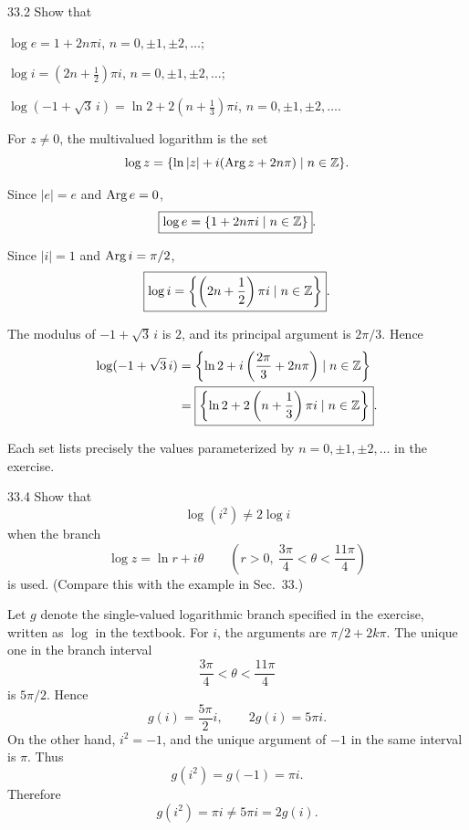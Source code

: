 \documentclass[11pt,oneside]{article}
\begin{document}
\begin{exercise}{33.2}
Show that
\begin{exercisesubparts}
    \item \(\log e=1+2n\pi i\), \(n=0, \pm1, \pm2, \ldots\);
    \item \(\displaystyle \log i=\left(2n+\frac12\right)\pi i\), \(n=0, \pm1, \pm2, \ldots\);
    \item \(\displaystyle \log(-1+\sqrt3\,i)=\ln2+2\left(n+\frac13\right)\pi i\), \(n=0, \pm1, \pm2, \ldots\).
\end{exercisesubparts}
\end{exercise}

\begin{solution}
For $z\ne0$, the multivalued logarithm is the set
\[
    \log z=\{\ln|z|+i(\operatorname{Arg} z+2n\pi)\mid n\in\mathbb{Z}\}.
\]
\begin{exercisesubparts}
    \item Since $|e|=e$ and $\operatorname{Arg} e=0$,
    \[
        \boxed{\log e=\{1+2n\pi i\mid n\in\mathbb{Z}\}}.
    \]

    \item Since $|i|=1$ and $\operatorname{Arg} i=\pi/2$,
    \[
        \boxed{\log i=\left\{\left(2n+\frac12\right)\pi i\mid n\in\mathbb{Z}\right\}}.
    \]

    \item The modulus of $-1+\sqrt3\,i$ is $2$, and its principal argument is $2\pi/3$. Hence
    \[
    \begin{aligned}
        \log(-1+\sqrt3\,i)
        &=\left\{\ln2+i\left(\frac{2\pi}{3}+2n\pi\right)\mid n\in\mathbb{Z}\right\}\\
        &=\boxed{\left\{\ln2+2\left(n+\frac13\right)\pi i\mid n\in\mathbb{Z}\right\}}.
    \end{aligned}
    \]
\end{exercisesubparts}
Each set lists precisely the values parameterized by $n=0, \pm1, \pm2, \ldots$ in the exercise.
\end{solution}

\begin{exercise}{33.4}
Show that
\[
    \log(i^2)\ne2\log i
\]
when the branch
\[
    \log z=\ln r+i\theta
    \qquad
    \left(r>0, \ \frac{3\pi}{4}<\theta<\frac{11\pi}{4}\right)
\]
is used. (Compare this with the example in Sec.~33.)
\end{exercise}

\begin{solution}
Let \(g\) denote the single-valued logarithmic branch specified in the exercise, written as \(\log\) in the textbook. For \(i\), the arguments are \(\pi/2+2k\pi\). The unique one in the branch interval
\[
    \frac{3\pi}{4}<\theta<\frac{11\pi}{4}
\]
is \(5\pi/2\). Hence
\[
    g(i)=\frac{5\pi}{2}i,
    \qquad
    2g(i)=5\pi i.
\]
On the other hand, \(i^2=-1\), and the unique argument of \(-1\) in the same interval is \(\pi\). Thus
\[
    g(i^2)=g(-1)=\pi i.
\]
Therefore
\[
    \boxed{g(i^2)=\pi i\ne5\pi i=2g(i)}.
\]
\end{solution}
\end{document}
